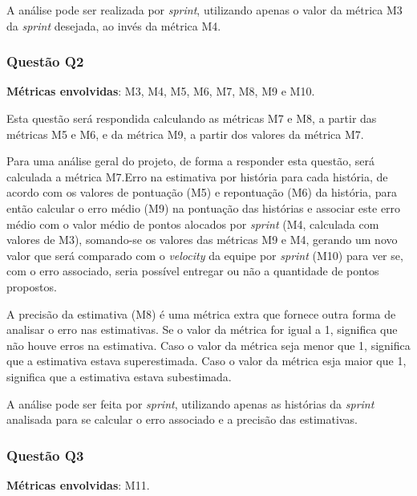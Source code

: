       		A análise pode ser realizada por \textit{sprint}, utilizando apenas o valor da métrica M3 da \textit{sprint} desejada, ao invés da métrica M4.

  		\subsubsection{Questão Q2}

  			\textbf{Métricas envolvidas}: M3, M4, M5, M6, M7, M8, M9 e M10.
 
  			Esta questão será respondida calculando as métricas M7 e M8, a partir das métricas M5 e M6, e da métrica M9, a partir dos
  			valores da métrica M7.

  			Para uma análise geral do projeto, de forma a responder esta questão, será calculada a métrica M7.Erro na estimativa por história para cada história, de acordo com os valores
  			de pontuação (M5) e repontuação (M6) da história, para então calcular o erro médio (M9) na pontuação das histórias e associar
  			este erro médio com o valor médio de pontos alocados por \textit{sprint} (M4, calculada com valores de M3), somando-se os valores
  			das métricas M9 e M4, gerando um novo valor que será comparado com o \textit{velocity} da equipe por \textit{sprint} (M10) para ver se, com o erro associado, seria possível entregar ou não a quantidade de pontos propostos.

  			A precisão da estimativa (M8) é uma métrica extra que fornece outra forma de analisar o erro nas estimativas. Se o valor da métrica
  			for igual a 1, significa que não houve erros na estimativa. Caso o valor da métrica seja menor que 1, significa que a estimativa estava
  			superestimada. Caso o valor da métrica esja maior que 1, significa que a estimativa estava subestimada.

  			A análise pode ser feita por \textit{sprint}, utilizando apenas as histórias da \textit{sprint} analisada para se calcular o erro associado e a precisão das estimativas.
	
	\subsubsection{Questão Q3}
	
		\textbf{Métricas envolvidas}: M11.

		
